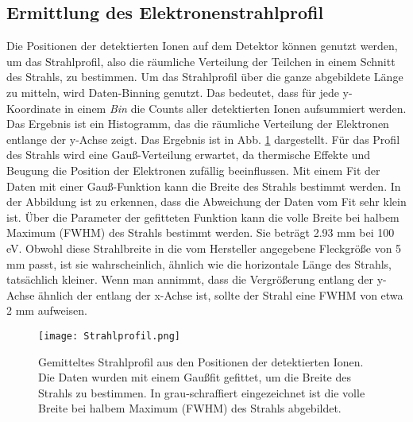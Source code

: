 \subsection{Ermittlung des Elektronenstrahlprofil}
Die Positionen der detektierten Ionen auf dem Detektor können genutzt werden, um das Strahlprofil, also die räumliche Verteilung der Teilchen in einem Schnitt des Strahls, zu bestimmen. Um das Strahlprofil über die ganze abgebildete Länge zu mitteln, wird Daten-Binning genutzt. Das bedeutet, dass für jede y-Koordinate in einem \textit{Bin} die Counts aller detektierten Ionen aufsummiert werden. Das Ergebnis ist ein Histogramm, das die räumliche Verteilung der Elektronen entlange der y-Achse zeigt. Das Ergebnis ist in Abb. \ref{fig:Strahlprofil} dargestellt. Für das Profil des Strahls wird eine Gauß-Verteilung erwartet, da thermische Effekte und Beugung die Position der Elektronen zufällig beeinflussen. Mit einem Fit der Daten mit einer Gauß-Funktion kann die Breite des Strahls bestimmt werden. In der Abbildung ist zu erkennen, dass die Abweichung der Daten vom Fit sehr klein ist. Über die Parameter der gefitteten Funktion kann die volle Breite bei halbem Maximum (FWHM) des Strahls bestimmt werden. Sie beträgt 2.93 mm bei 100 eV. Obwohl diese Strahlbreite in die vom Hersteller angegebene Fleckgröße von 5 mm passt, ist sie wahrscheinlich, ähnlich wie die horizontale Länge des Strahls, tatsächlich kleiner. Wenn man annimmt, dass die Vergrößerung entlang der y-Achse ähnlich der entlang der x-Achse ist, sollte der Strahl eine FWHM von etwa 2 mm aufweisen.

\begin{figure}
    \centering
    \texttt{[image: Strahlprofil.png]}
    \caption[Gemitteltes Strahlprofil]{Gemitteltes Strahlprofil aus den Positionen der detektierten Ionen. Die Daten wurden mit einem Gaußfit gefittet, um die Breite des Strahls zu bestimmen. In grau-schraffiert eingezeichnet ist die volle Breite bei halbem Maximum (FWHM) des Strahls abgebildet.}
    \label{fig:Strahlprofil} 
\end{figure}